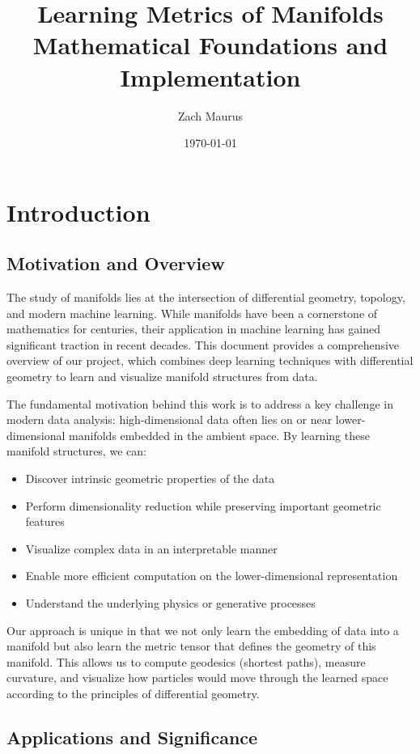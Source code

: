 \documentclass[11pt,a4paper]{article}
\title{\Huge \textbf{Learning Metrics of Manifolds} \\[0.5cm] \Large Mathematical Foundations and Implementation}
\author{Zach Maurus}
\date{\today}
\begin{document}
\maketitle
\tableofcontents
\newpage

\section{Introduction}
\subsection{Motivation and Overview}

The study of manifolds lies at the intersection of differential geometry, topology, and modern machine learning. While manifolds have been a cornerstone of mathematics for centuries, their application in machine learning has gained significant traction in recent decades. This document provides a comprehensive overview of our project, which combines deep learning techniques with differential geometry to learn and visualize manifold structures from data.

The fundamental motivation behind this work is to address a key challenge in modern data analysis: high-dimensional data often lies on or near lower-dimensional manifolds embedded in the ambient space. By learning these manifold structures, we can:

\begin{itemize}
    \item Discover intrinsic geometric properties of the data
    \item Perform dimensionality reduction while preserving important geometric features
    \item Visualize complex data in an interpretable manner
    \item Enable more efficient computation on the lower-dimensional representation
    \item Understand the underlying physics or generative processes
\end{itemize}

Our approach is unique in that we not only learn the embedding of data into a manifold but also learn the metric tensor that defines the geometry of this manifold. This allows us to compute geodesics (shortest paths), measure curvature, and visualize how particles would move through the learned space according to the principles of differential geometry.

\subsection{Applications and Significance}
\end{document}
